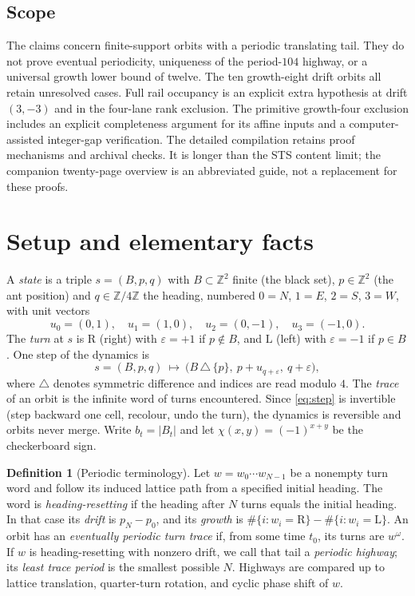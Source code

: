 \documentclass[11pt,letterpaper]{article}
\theoremstyle{plain}
\theoremstyle{definition}
\newtheorem{definition}[theorem]{Definition}
\newcommand{\Z}{\mathbb{Z}}
\newcommand{\che}{\chi}
\newcommand{\turnR}{\mathrm{R}}
\newcommand{\turnL}{\mathrm{L}}
\begin{document}
\begin{NoHyper}
\subsection{Scope}
The claims concern finite-support orbits with a periodic translating tail.
They do not prove eventual periodicity, uniqueness of the period-$104$ highway,
or a universal growth lower bound of twelve. The ten growth-eight drift
orbits all retain unresolved cases. Full rail occupancy is an explicit
extra hypothesis at drift $(3,-3)$ and in the four-lane rank exclusion.
The primitive growth-four exclusion includes an explicit completeness argument
for its affine inputs and a computer-assisted integer-gap verification.
The detailed compilation retains proof mechanisms and archival checks.
It is longer than the STS content limit; the companion twenty-page overview
is an abbreviated guide, not a replacement for these proofs.

\section{Setup and elementary facts}\label{sec:setup}

A \emph{state} is a triple $s=(B,p,q)$ with $B\subset\Z^2$ finite (the black set),
$p\in\Z^2$ (the ant position) and $q\in\Z/4\Z$ the heading, numbered $0=N$, $1=E$,
$2=S$, $3=W$, with unit vectors
\[
u_0=(0,1),\quad u_1=(1,0),\quad u_2=(0,-1),\quad u_3=(-1,0).
\]
The \emph{turn} at $s$ is $\turnR$ (right) with $\varepsilon=+1$ if $p\notin B$, and
$\turnL$ (left) with $\varepsilon=-1$ if $p\in B$. One step of the dynamics is
\begin{equation}\label{eq:step}
s=(B,p,q)\ \longmapsto\ \bigl(B\,\triangle\,\{p\},\ p+u_{q+\varepsilon},\ q+\varepsilon\bigr),
\end{equation}
where $\triangle$ denotes symmetric difference and indices are read modulo $4$. The
\emph{trace} of an orbit is the infinite word of turns encountered. Since
\eqref{eq:step} is invertible (step backward one cell, recolour, undo the turn), the
dynamics is reversible and orbits never merge. Write $b_t=|B_t|$ and let
$\che(x,y)=(-1)^{x+y}$ be the checkerboard sign.

\begin{definition}[Periodic terminology]\label{def:periodic}
Let $w=w_0\cdots w_{N-1}$ be a nonempty turn word and follow its induced lattice
path from a specified initial heading. The word is \emph{heading-resetting} if the
heading after $N$ turns equals the initial heading. In that case its \emph{drift} is
$p_N-p_0$, and its \emph{growth} is
$\#\{i:w_i=\turnR\}-\#\{i:w_i=\turnL\}$. An orbit has an \emph{eventually periodic
turn trace} if, from some time $t_0$, its turns are $w^\omega$. If $w$ is
heading-resetting with nonzero drift, we call that tail a \emph{periodic highway};
its \emph{least trace period} is the smallest possible $N$. Highways are compared up
to lattice translation, quarter-turn rotation, and cyclic phase shift of $w$.
\end{definition}


\end{NoHyper}
\end{document}
